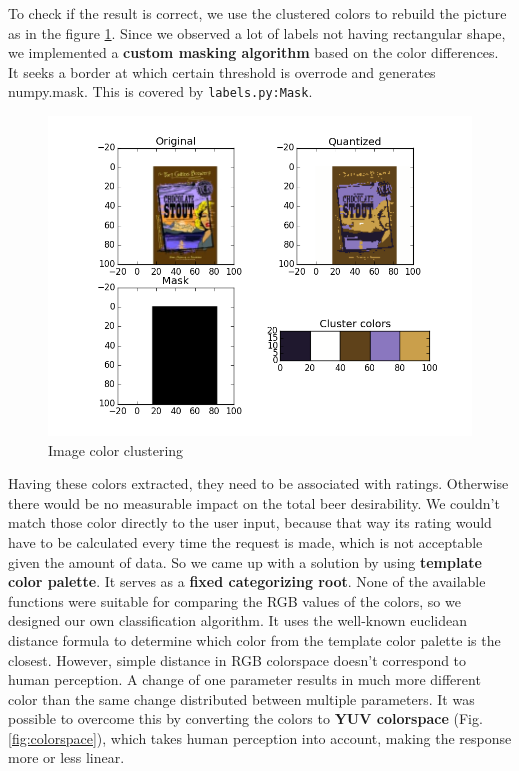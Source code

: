 \documentclass[10pt]{IEEEtran}
\begin{document}
To check if the result is correct, we use the clustered colors to rebuild the picture as in the figure \ref{fig:colorClustering}. Since we observed a lot of labels not having rectangular shape, we implemented a \textbf{custom masking algorithm} based on the color differences. It seeks a border at which certain threshold is overrode and generates numpy.mask. This is covered by \texttt{labels.py:Mask}. 

\begin{figure}[b]
  \centering
  \includegraphics[width=\columnwidth]{./graphics/1.png}
  \caption{Image color clustering}
  \label{fig:colorClustering}
\end{figure}

Having these colors extracted, they need to be associated with ratings. Otherwise there would be no measurable impact on the total beer desirability. We couldn't match those color directly to the user input, because that way its rating would have to be calculated  every time the request is made, which is not acceptable given the amount of data. So we came up with a solution by using \textbf{template color palette}. It serves as a \textbf{fixed categorizing root}. None of the available functions were suitable for comparing the RGB values of the colors, so we designed our own classification algorithm. It uses the well-known euclidean distance formula to determine which color from the template color palette is the closest. However, simple distance in RGB colorspace doesn't correspond to human perception. A change of one parameter results in much more different color than the same change distributed between multiple parameters. It was possible to overcome this by converting the colors to \textbf{YUV colorspace} (Fig. \ref{fig:colorspace}), which takes human perception into account, making the response more or less linear. 
\end{document}
